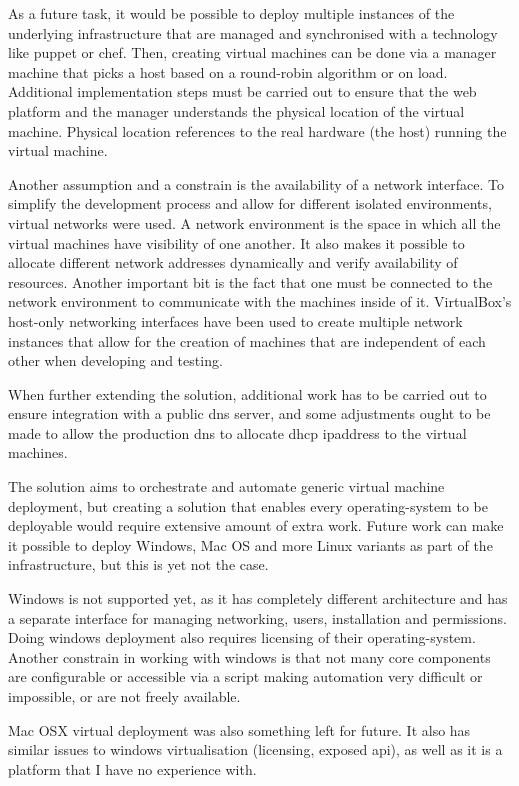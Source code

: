 \documentclass{article}
\begin{document}
As a future task, it would be possible to deploy multiple instances of the underlying infrastructure that are managed and synchronised with a technology like puppet or chef. Then, creating virtual machines can be done via a manager machine that picks a host based on a round-robin algorithm or on load. Additional implementation steps must be carried out to ensure that the web platform and the manager understands the physical location of the virtual machine. Physical location references to the real hardware (the host) running the virtual machine.

Another assumption and a constrain is the availability of a network interface. To simplify the development process and allow for  different isolated environments, virtual networks were used. A network environment is the space in which all the virtual machines have visibility of one another. It also makes it possible to allocate different network addresses dynamically and verify availability of resources. Another important bit is the fact that one must be connected to the network environment to communicate with the machines inside of it. VirtualBox's host-only networking interfaces have been used to create multiple network instances that allow for the creation of machines that are independent of each other when developing and testing.

When further extending the solution, additional work has to be carried out to ensure integration with a public \gls{dns} server, and some adjustments ought to be made to allow the production \gls{dns} to allocate \gls{dhcp} \gls{ipaddress} to the virtual machines.

The solution aims to orchestrate and automate generic virtual machine deployment, but creating a solution that enables every \gls{operating-system} to be deployable would require extensive amount of extra work. Future work can make it possible to deploy Windows, Mac OS and more Linux variants as part of the infrastructure, but this is yet not the case.

Windows is not supported yet, as it has completely different architecture and has a separate interface for managing networking, users, installation and permissions. Doing windows deployment also requires licensing of their \gls{operating-system}. Another constrain in working with windows is that not many core components are configurable or accessible via a script making automation very difficult or impossible, or are not freely available.

Mac OSX virtual deployment was also something left for future. It also has similar issues to windows virtualisation (licensing, exposed \gls{api}), as well as it is a platform that I have no experience with.
\end{document}
